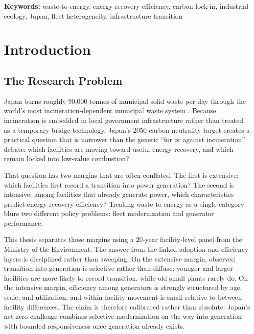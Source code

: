 \documentclass[12pt,a4paper]{article}
\begin{document}
\noindent\textbf{Keywords:} waste-to-energy, energy recovery efficiency, carbon lock-in, industrial ecology, Japan, fleet heterogeneity, infrastructure transition

\clearpage
\tableofcontents
\clearpage


\section{Introduction}

\subsection{The Research Problem}

Japan burns roughly 90,000 tonnes of municipal solid waste per day through the world's most incineration-dependent municipal waste system \citep{MOEJ2022}. Because incineration is embedded in local government infrastructure rather than treated as a temporary bridge technology, Japan's 2050 carbon-neutrality target creates a practical question that is narrower than the generic ``for or against incineration'' debate: which facilities are moving toward useful energy recovery, and which remain locked into low-value combustion?

That question has two margins that are often conflated. The first is extensive: which facilities first record a transition into power generation? The second is intensive: among facilities that already generate power, which characteristics predict energy recovery efficiency? Treating waste-to-energy as a single category blurs two different policy problems: fleet modernization and generator performance.

This thesis separates those margins using a 20-year facility-level panel from the Ministry of the Environment. The answer from the linked adoption and efficiency layers is disciplined rather than sweeping. On the extensive margin, observed transition into generation is selective rather than diffuse: younger and larger facilities are more likely to record transition, while old small plants rarely do. On the intensive margin, efficiency among generators is strongly structured by age, scale, and utilization, and within-facility movement is small relative to between-facility differences. The claim is therefore calibrated rather than absolute: Japan's net-zero challenge combines selective modernization on the way into generation with bounded responsiveness once generation already exists.
\end{document}
